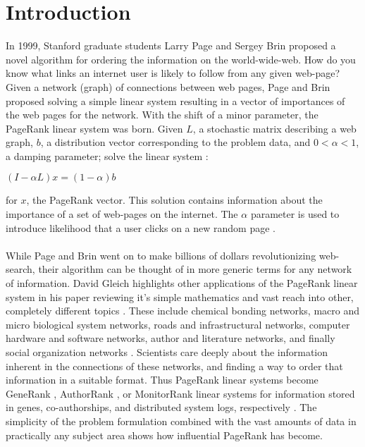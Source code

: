 \documentclass{article}
\begin{document}
\section{Introduction}
In 1999, Stanford graduate students Larry Page and Sergey Brin proposed a novel algorithm for ordering the information on the world-wide-web. How do you know what links an internet user is likely to follow from any given web-page? Given a network (graph) of connections between web pages, Page and Brin proposed solving a simple linear system resulting in a vector of importances of the web pages for the network. With the shift of a minor parameter, the PageRank linear system was born. Given \textbf{$L$}, a stochastic matrix describing a web graph, \textbf{$b$}, a distribution vector corresponding to the problem data, and $0 < \alpha < 1$, a damping parameter; solve the linear system \cite{Page:1999}:\\
\begin{center}
$(I-\alpha L)x = (1-\alpha)b$ \\
\end{center}
for \textbf{$x$}, the PageRank vector. This solution contains information about the importance of a set of web-pages on the internet. The $\alpha$ parameter is used to introduce likelihood that a user clicks on a new random page \cite{Page:1999}.\\
\\
While Page and Brin went on to make billions of dollars revolutionizing web-search, their algorithm can be thought of in more generic terms for any network of information. David Gleich highlights other applications of the PageRank linear system in his paper reviewing it's simple mathematics and vast reach into other, completely different topics \cite{Gleich:2015}. These include chemical bonding networks, macro and micro biological system networks, roads and infrastructural networks, computer hardware and software networks, author and literature networks, and finally social organization networks \cite{Gleich:2015}. Scientists care deeply about the information inherent in the connections of these networks, and finding a way to order that information in a suitable format. Thus PageRank linear systems become GeneRank \cite{Jiang:2009}, AuthorRank \cite{Liu:2005}, or MonitorRank \cite{Kim:2013} linear systems for information stored in genes, co-authorships, and distributed system logs, respectively \cite{Gleich:2015}. The simplicity of the problem formulation combined with the vast amounts of data in practically any subject area shows how influential PageRank has become.\\
\end{document}
